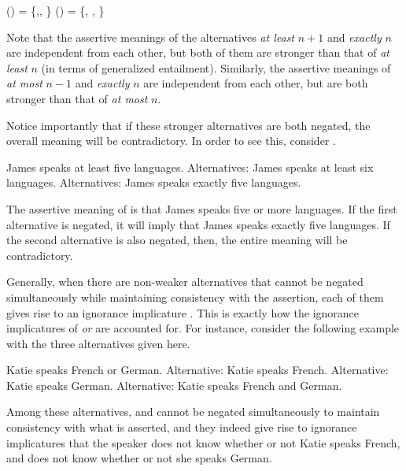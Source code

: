 \documentclass[output=paper]{langscibook}
\begin{document}
    \ea  \label{don-sud:alts}
        \ea {}() = \{,, \}
        \ex {}() = \{, , \}
        \z
    \z
    
\noindent Note that the assertive meanings of the alternatives \textit{at least} $n+1$ and \textit{exactly} $n$ are independent from each other, but both of them are stronger than that of \textit{at least} $n$ (in terms of generalized entailment). Similarly, the assertive meanings of \textit{at most} $n-1$ and \textit{exactly} $n$ are independent from each other, but are both stronger than that of \textit{at most} $n$.

Notice importantly that if these stronger alternatives are both negated, the overall meaning will be contradictory. In order to see this, consider .

    \ea James speaks at least five languages. \label{don-sud:ii-ex}
        \ea Alternatives: James speaks at least six languages.
        \ex Alternatives: James speaks exactly five languages.
        \z
    \z

\noindent The assertive meaning of  is that James speaks five or more languages. If the first alternative is negated, it will imply that James speaks exactly five languages. If the second alternative is also negated, then, the entire meaning will be contradictory.

Generally, when there are non-weaker alternatives that cannot be negated simultaneously while maintaining consistency with the assertion, each of them gives rise to an ignorance implicature \citep{sauerland, fox, mayr, meyer, schwarz}. This is exactly how the ignorance implicatures of \textit{or} are accounted for. For instance, consider the following example with the three alternatives given here.

    \ea Katie speaks French or German.\label{don-sud:or}
        \ea Alternative: Katie speaks French.\label{don-sud:fr}
        \ex Alternative: Katie speaks German.\label{don-sud:gr}
        \ex Alternative: Katie speaks French and German.\label{don-sud:frandgr}
        \z
    \z

\noindent Among these alternatives,  and  cannot be negated simultaneously to maintain consistency with what is asserted, and they indeed give rise to ignorance implicatures that the speaker does not know whether or not Katie speaks French, and does not know whether or not she speaks German.
\end{document}
